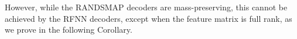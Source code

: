 \documentclass{article}
\begin{document}

However, while the RANDSMAP decoders are mass-preserving, this cannot be achieved by the RFNN decoders, except when the feature matrix is full rank, as we prove in the following Corollary.
\end{document}
